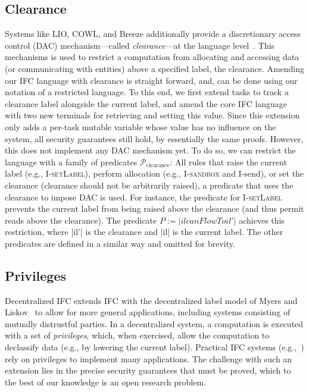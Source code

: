 \subsection{Clearance}
%
Systems like LIO, COWL, and Breeze additionally provide a discretionary access
control (DAC) mechanism---called \emph{clearance}---at the language
level~\cite{Hritcu:2013:YIB:2497621.2498098, lio}.
%
This mechanisms is used to restrict a computation from allocating and
accessing data (or communicating with entities) above a specified
label, the clearance.
%
Amending our IFC language with clearance is straight forward,
and, can be done using our notation of a restricted language.
%
To this end, we first extend tasks to track a clearance label
alongside the current label, and amend the core IFC language with two
new terminals for retrieving and setting this value.
%
Since this extension only adds a per-task mutable variable whose value
has no influence on the system, all security guarantees still
hold, by essentially the same proofs.
%
However, this does not implement any DAC mechanism yet.
%
To do so, we can restrict the language with a family of predicates
$\mathcal{P}_\text{clearance}$:
All rules that
raise the current label (e.g., \textsc{I-setLabel}), perform
allocation (e.g., \textsc{I-sandbox} and \textsf{I-send}), or set the
clearance (clearance should not be arbitrarily raised), a predicate
that uses the clearance to impose DAC is used.
%
For instance, the predicate for \textsc{I-setLabel} prevents the
current label from being raised above the clearance (and thus permit
reads above the clearance).  The predicate $P := |il
canFlowTo il'|$ achieves this restriction, where |il'| is the
clearance and |il| is the current
label.
%
The other predicates are defined in a similar way and omitted for
brevity.


\subsection{Privileges}
Decentralized IFC extends IFC with the decentralized label model of
Myers and Liskov~\cite{myers:dlm} to allow for more general
applications, including systems consisting of mutually distrustful
parties.  In a decentralized system, a computation is executed with a
set of \emph{privileges}, which, when exercised, allow the computation
to declassify data (e.g., by lowering the current label).
%
Practical IFC systems
(e.g.,~\cite{Zeldovich:2006, lio,
  Hritcu:2013:YIB:2497621.2498098, myers:jif}) rely on privileges to
implement many applications.
%
%
The challenge with such an extension lies in the precise
security guarantees that must be proved, which to the best of our
knowledge is an open research problem.

